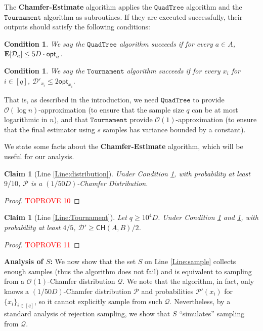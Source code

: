 \documentclass[11pt]{article}
\theoremstyle{plain}
\newtheorem{clm}[theorem]{Claim}
\newtheorem{cond}[theorem]{Condition}
\newcommand{\calP}{\mathcal{P}} \newcommand{\calD}{\mathcal{D}}
\newcommand{\calQ}{\mathcal{Q}}
\newcommand{\OO}{\mathcal{O}}
\newcommand{\e}[1]{\text{\bf E}\normalfont\lbrack #1 \rbrack}
\newcommand{\opt}{\mathsf{opt}}
\newcommand{\Tournament}{\texttt{Tournament}}
\newcommand{\QuadTree}{\texttt{QuadTree}} \usepackage{microtype}
\begin{document}
The \textbf{Chamfer-Estimate} algorithm applies the $\QuadTree$ algorithm and the $\Tournament$ algorithm as subroutines. If they are executed successfully, their outputs should satisfy the following conditions:


\begin{cond}\label{Condition:QuadTree}
    We say the $\QuadTree$ algorithm succeeds if for every $a \in A$, $\e{\calD_a} \leq 5{{D}} \cdot \opt_{a}$.
\end{cond}

\begin{cond}\label{Condition:Tournament}
    We say the $\Tournament$ algorithm succeeds if for every $x_i$ for $i \in [q]$, $\calD'_{x_i} \leq 2\opt_{x_i}$. 
\end{cond}

That is,  as described in the introduction, we need $\QuadTree$ to provide $\OO(\log n)$-approximation (to ensure that the sample size $q$ can be at most logarithmic in $n$), and that $\Tournament$ provide $\OO(1)$-approximation (to ensure that the final estimator using $s$ samples has variance bounded by a constant). 

We state some facts about the \textbf{Chamfer-Estimate} algorithm, which will be useful for our analysis. 



\begin{clm}[Line \ref{Line:distribution}]\label{Claim:P}
    Under Condition \ref{Condition:QuadTree}, with probability at least $9/10$, $\calP$ is a $(1/50{{D}})$-Chamfer Distribution.
\end{clm}

\begin{proof}\textcolor{red}{TOPROVE 10}\end{proof}

\begin{clm}[Line \ref{Line:Tournament}]\label{Claim:D'}       Let $q \geq 10^4 {{D}}$. Under Condition \ref{Condition:QuadTree} and \ref{Condition:Tournament}, with probability at least $4/5$, $\calD' \geq \mathsf{CH}(A, B)/2$. 
\end{clm}

\begin{proof}\textcolor{red}{TOPROVE 11}\end{proof}

{\bf Analysis of $S$:} We now show that the set $S$ on Line \ref{Line:sample} collects enough samples (thus the algorithm does not fail) and is equivalent to sampling from a $\OO(1)$-Chamfer distribution $\calQ$. We note that the algorithm, in fact, only knows a $(1/50{{D}})$-Chamfer distribution $\calP$ and probabilities $\calP'(x_i)$ for $\{x_i\}_{i \in [q]}$, so it cannot explicitly sample from such $\calQ$. Nevertheless, by a standard analysis of rejection sampling, we show that $S$ ``simulates'' sampling from $\calQ$.
\end{document}
